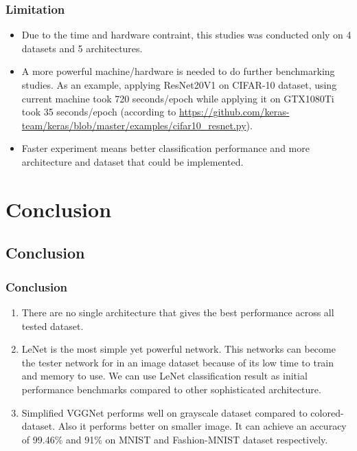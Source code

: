 \documentclass{beamer}
\begin{document}
\begin{frame}\frametitle{Limitation}
\begin{itemize}
	\item Due to the time and hardware contraint, this studies was conducted only on 4 datasets and 5 architectures.
	\item  A more powerful machine/hardware is needed to do further benchmarking studies. As an example, applying ResNet20V1 on CIFAR-10 dataset, using current machine took 720 seconds/epoch while applying it on GTX1080Ti took 35 seconds/epoch (according to \href{https://github.com/keras-team/keras/blob/master/examples/cifar10\_resnet.py}{https://github.com/keras-team/keras/blob/master/examples/cifar10\_resnet.py}).
	\item  Faster experiment means better classification performance and more architecture and dataset that could be implemented. 
\end{itemize}
\end{frame}

\section{Conclusion}
\subsection{Conclusion}
\begin{frame}\frametitle{Conclusion}
\begin{enumerate}
	\item There are no single architecture that gives the best performance across all tested dataset.
	\item LeNet is the most simple yet powerful network.
	This networks can become the tester network for in an image dataset because of its low time to train and memory to use. We can use LeNet classification result as initial performance benchmarks compared to other sophisticated architecture.
	\item Simplified VGGNet performs well on grayscale dataset compared to colored-dataset. Also it performs better on smaller image. It can achieve an accuracy of 99.46\% and 91\% on MNIST and Fashion-MNIST dataset respectively.
	
\end{enumerate}
\end{frame}
\end{document}
